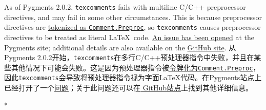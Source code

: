 \begin{optionlist}
\begin{paracol}{2}
    As of Pygments 2.0.2, \texttt{texcomments} fails with multiline C/C++ preprocessor directives, and may fail in some other circumstances.  This is because preprocessor directives are \href{http://pygments.org/docs/tokens/}{tokenized as \texttt{Comment.Preproc}}, so \texttt{texcomments} causes preprocessor directives to be treated as literal \LaTeX\ code.  \href{https://bitbucket.org/birkenfeld/pygments-main/issue/1086/wrong-processing-of-in-c-c-macros-if-is}{An issue has been opened} at the Pygments site; additional details are also available on the \href{https://github.com/gpoore/minted/issues/66}{ GitHub site}.
    \switchcolumn
    从Pygments 2.0.2开始，\texttt{texcomments}在多行C/C++预处理器指令中失败，并且在某些其他情况下可能会失败。这是因为预处理器指令被\href{http://pygments.org/docs/tokens/}{令牌化为\texttt{Comment.Preproc}}，因此\texttt{texcomments}会导致将预处理器指令视为字面\LaTeX{}代码。在Pygments站点上已经打开了一个\href{https://bitbucket.org/birkenfeld/pygments-main/issue/1086/wrong-processing-of-in-c-c-macros-if-is}{问题}；关于此问题还可以在\href{https://github.com/gpoore/minted/issues/66}{ GitHub站点}上找到其他详细信息。

\switchcolumn[0]*%
\end{paracol}
\end{optionlist}



